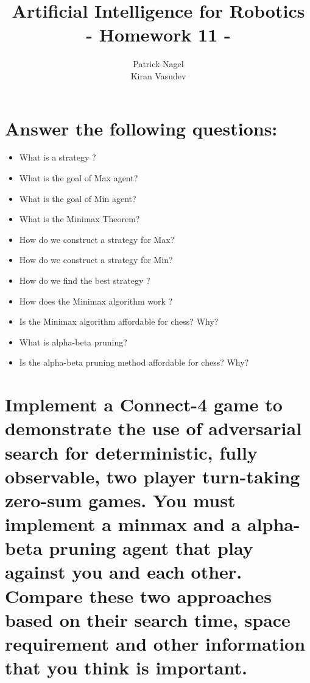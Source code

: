 \documentclass[11pt]{article}
\title{\textbf{Artificial Intelligence for Robotics\\
- Homework 11} -
}
\author{Patrick Nagel\\Kiran Vasudev}
\date{ }
\begin{document}
\maketitle

\section{Answer the following questions:}
\begin{itemize}
	\item What is a strategy ?\\
	
	\item What is the goal of Max agent?\\
	
	\item What is the goal of Min agent?\\
	
	\item What is the Minimax Theorem?\\
	
	\item How do we construct a strategy for Max?\\
	
	\item How do we construct a strategy for Min?\\
	
	\item How do we find the best strategy ?\\
	
	\item How does the Minimax algorithm work ?\\
	
	\item Is the Minimax algorithm affordable for chess? Why?\\
	
	\item What is alpha-beta pruning?\\
	
	\item Is the alpha-beta pruning method affordable for chess? Why?\\
	
\end{itemize}


\section{Implement a Connect-4 game to demonstrate the use of adversarial search for deterministic, fully observable, two player turn-taking zero-sum games. You must implement a minmax and a alpha-beta pruning agent that play against you and each other. Compare these two approaches based on their search time, space requirement and other information that you think is important.}
\end{document}
